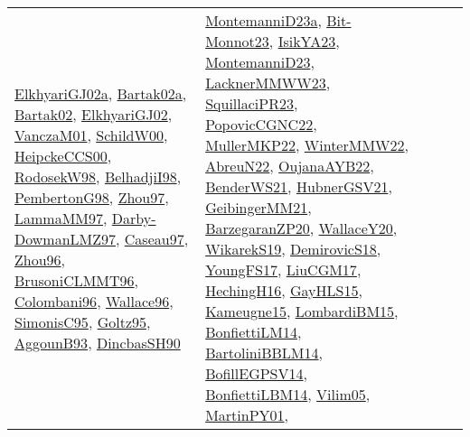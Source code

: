 {\begin{longtable}{lp{3cm}>{\raggedright}p{6cm}>{\raggedright}p{6cm}p{8cm}}
\href{papers/ElkhyariGJ02a.pdf}{ElkhyariGJ02a}\cite{ElkhyariGJ02a}, \href{papers/Bartak02a.pdf}{Bartak02a}\cite{Bartak02a}, \href{papers/Bartak02.pdf}{Bartak02}\cite{Bartak02}, \href{papers/ElkhyariGJ02.pdf}{ElkhyariGJ02}\cite{ElkhyariGJ02}, \href{papers/VanczaM01.pdf}{VanczaM01}\cite{VanczaM01}, \href{articles/SchildW00.pdf}{SchildW00}\cite{SchildW00}, \href{articles/HeipckeCCS00.pdf}{HeipckeCCS00}\cite{HeipckeCCS00}, \href{papers/RodosekW98.pdf}{RodosekW98}\cite{RodosekW98}, \href{articles/BelhadjiI98.pdf}{BelhadjiI98}\cite{BelhadjiI98}, \href{papers/PembertonG98.pdf}{PembertonG98}\cite{PembertonG98}, \href{articles/Zhou97.pdf}{Zhou97}\cite{Zhou97}, \href{articles/LammaMM97.pdf}{LammaMM97}\cite{LammaMM97}, \href{articles/Darby-DowmanLMZ97.pdf}{Darby-DowmanLMZ97}\cite{Darby-DowmanLMZ97}, \href{papers/Caseau97.pdf}{Caseau97}\cite{Caseau97}, \href{papers/Zhou96.pdf}{Zhou96}\cite{Zhou96}, \href{papers/BrusoniCLMMT96.pdf}{BrusoniCLMMT96}\cite{BrusoniCLMMT96}, \href{papers/Colombani96.pdf}{Colombani96}\cite{Colombani96}, \href{articles/Wallace96.pdf}{Wallace96}\cite{Wallace96}, \href{papers/SimonisC95.pdf}{SimonisC95}\cite{SimonisC95}, \href{papers/Goltz95.pdf}{Goltz95}\cite{Goltz95}, \href{articles/AggounB93.pdf}{AggounB93}\cite{AggounB93}, \href{articles/DincbasSH90.pdf}{DincbasSH90}\cite{DincbasSH90} & \href{articles/MontemanniD23a.pdf}{MontemanniD23a}\cite{MontemanniD23a}, \href{papers/Bit-Monnot23.pdf}{Bit-Monnot23}\cite{Bit-Monnot23}, \href{articles/IsikYA23.pdf}{IsikYA23}\cite{IsikYA23}, \href{articles/MontemanniD23.pdf}{MontemanniD23}\cite{MontemanniD23}, \href{articles/LacknerMMWW23.pdf}{LacknerMMWW23}\cite{LacknerMMWW23}, \href{papers/SquillaciPR23.pdf}{SquillaciPR23}\cite{SquillaciPR23}, \href{papers/PopovicCGNC22.pdf}{PopovicCGNC22}\cite{PopovicCGNC22}, \href{articles/MullerMKP22.pdf}{MullerMKP22}\cite{MullerMKP22}, \href{papers/WinterMMW22.pdf}{WinterMMW22}\cite{WinterMMW22}, \href{articles/AbreuN22.pdf}{AbreuN22}\cite{AbreuN22}, \href{papers/OujanaAYB22.pdf}{OujanaAYB22}\cite{OujanaAYB22}, \href{papers/BenderWS21.pdf}{BenderWS21}\cite{BenderWS21}, \href{articles/HubnerGSV21.pdf}{HubnerGSV21}\cite{HubnerGSV21}, \href{papers/GeibingerMM21.pdf}{GeibingerMM21}\cite{GeibingerMM21}, \href{papers/BarzegaranZP20.pdf}{BarzegaranZP20}\cite{BarzegaranZP20}, \href{articles/WallaceY20.pdf}{WallaceY20}\cite{WallaceY20}, \href{articles/WikarekS19.pdf}{WikarekS19}\cite{WikarekS19}, \href{papers/DemirovicS18.pdf}{DemirovicS18}\cite{DemirovicS18}, \href{papers/YoungFS17.pdf}{YoungFS17}\cite{YoungFS17}, \href{papers/LiuCGM17.pdf}{LiuCGM17}\cite{LiuCGM17}, \href{papers/HechingH16.pdf}{HechingH16}\cite{HechingH16}, \href{papers/GayHLS15.pdf}{GayHLS15}\cite{GayHLS15}, \href{articles/Kameugne15.pdf}{Kameugne15}\cite{Kameugne15}, \href{papers/LombardiBM15.pdf}{LombardiBM15}\cite{LombardiBM15}, \href{papers/BonfiettiLM14.pdf}{BonfiettiLM14}\cite{BonfiettiLM14}, \href{papers/BartoliniBBLM14.pdf}{BartoliniBBLM14}\cite{BartoliniBBLM14}, \href{papers/BofillEGPSV14.pdf}{BofillEGPSV14}\cite{BofillEGPSV14}, \href{articles/BonfiettiLBM14.pdf}{BonfiettiLBM14}\cite{BonfiettiLBM14}, \href{papers/Vilim05.pdf}{Vilim05}\cite{Vilim05}, \href{articles/MartinPY01.pdf}{MartinPY01}\cite{MartinPY01}, 
\end{longtable}}
